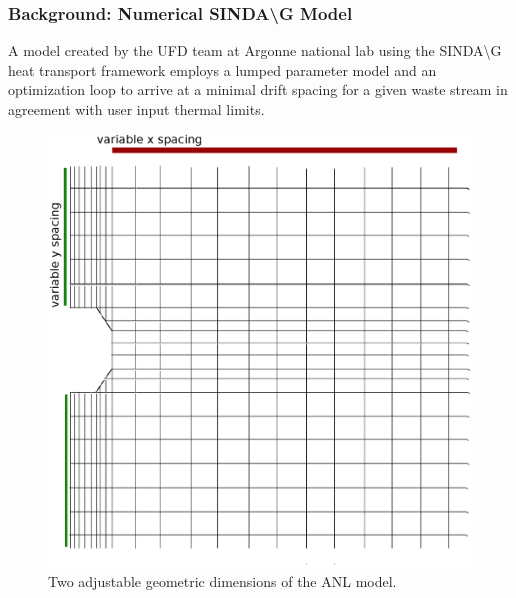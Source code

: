 

\begin{frame}[ctb!]
  \frametitle{Background: Numerical SINDA{\textbackslash}G Model}
  A model created by the UFD team at Argonne national lab using the 
  SINDA{\textbackslash}G heat transport framework employs a lumped parameter 
  model and an optimization loop to arrive at a minimal drift spacing for a 
  given waste stream in agreement with user input thermal limits. 
  \begin{figure}[h!]
    \begin{center}
      \includegraphics[height=.5\textheight]{sindageom.eps}
    \end{center}
    \caption{Two adjustable geometric dimensions of the ANL model.} 
    \label{fig:sindageom}
  \end{figure}
\end{frame}


